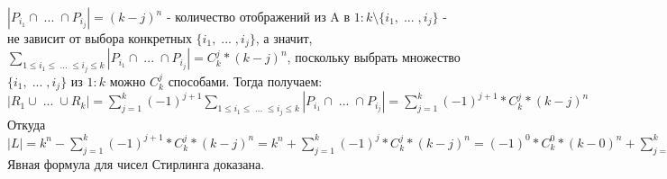 $|P_{i_1} \cap \; ... \; \cap P_{i_j}| = (k - j)^n$ - количество отображений из A в $1:k \setminus \{i_1, \; ... \; , i_j\}$ - не зависит от выбора конкретных $\{i_1, \; ... \; , i_j\}$, а значит, $\sum\limits_{1 \leq i_1 \leq \; ... \; \leq i_j \leq k}|P_{i_1} \cap \; ... \; \cap P_{i_j}| = C_k^j * (k - j)^n$, поскольку выбрать множество $\{i_1, \; ... \; , i_j\}$ из $1:k$ можно $C_k^j$ способами. Тогда получаем:\\
$|R_1 \cup \; ... \; \cup R_k| = \sum_{j = 1}^{k}(-1)^{j + 1}\sum\limits_{1 \leq i_1 \leq \; ... \; \leq i_j \leq k}|P_{i_1} \cap \; ... \; \cap P_{i_j}| = \sum\limits_{j = 1}^{k} (-1)^{j + 1} * C_k^j * (k - j)^n$\\
Откуда\\
$|L| = k^n - \sum\limits_{j = 1}^{k} (-1)^{j + 1} * C_k^j * (k - j)^n = k^n + \sum\limits_{j = 1}^{k} (-1)^j * C_k^j * (k - j)^n = (-1)^0 * C_k^0 * (k - 0)^n + \sum\limits_{j = 1}^{k} (-1)^j * C_k^j * (k - j)^n = \sum\limits_{j = 0}^{k} (-1)^j * C_k^j * (k - j)^n$\\
Явная формула для чисел Стирлинга доказана.